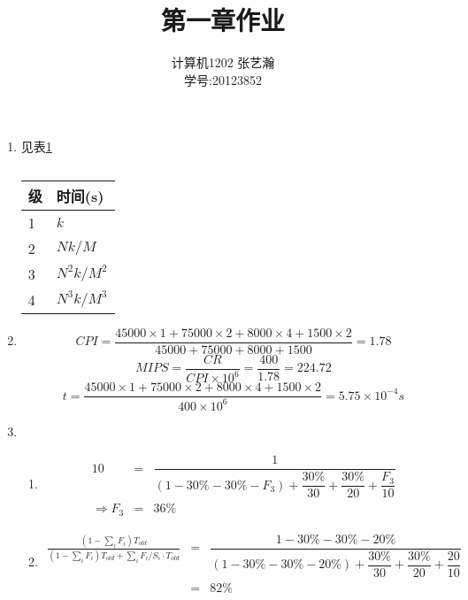 \documentclass[11pt]{article}
\begin{document}
\title{第一章作业}
\author{计算机1202 \quad 张艺瀚\\学号:20123852}
\maketitle

\thispagestyle{fancy}
\normalsize

\begin{enumerate}
  \item 见表\ref{tab: tab1}
    \begin{table}[htbp]
    \centering  %
      \begin{tabular}{ll}  %
        \hline
        级 &时间(s) \\
        \hline  %
        1 &$k$ \\
        2 &$Nk/M$ \\
        3 &$N^2k/M^2$ \\
        4 &$N^3k/M^3$ \\
        \hline
      \end{tabular}
    \caption{\label{tab: tab1}}
    \end{table}
  \item 
    \[ CPI = \frac{45000 \times 1 + 75000 \times 2 + 8000 \times 4 + 1500 \times 2}{45000 + 75000 + 8000 + 1500} = 1.78 \]
    \[ MIPS = \frac{CR}{CPI \times 10^6} = \frac{400}{1.78} = 224.72 \]
    \[ t = \frac{45000 \times 1 + 75000 \times 2 + 8000 \times 4 + 1500 \times 2}{400 \times 10^6} = 5.75 \times 10^{-4}s \]
  \item 
    \begin{enumerate}
      \item 
        \begin{eqnarray*}
          10 &=& \dfrac{1}{(1-30\%-30\%-F_3) + \dfrac{30\%}{30} + \dfrac{30\%}{20} + \dfrac{F_3}{10}} \\
          \Longrightarrow F_3 &=& 36\%
        \end{eqnarray*}
      \item 
        \begin{eqnarray*}
          \frac{(1-\sum_i F_i)T_{old}}{(1-\sum_i F_i)T_{old} + \sum_i F_i / S_i \cdot T_{old}} 
          &=& \dfrac{1-30\%-30\%-20\%}{(1-30\%-30\%-20\%) + \dfrac{30\%}{30} + \dfrac{30\%}{20} + \dfrac{20}{10}} \\
          &=& 82\%
        \end{eqnarray*}
    \end{enumerate}

\end{enumerate}
\end{document}
